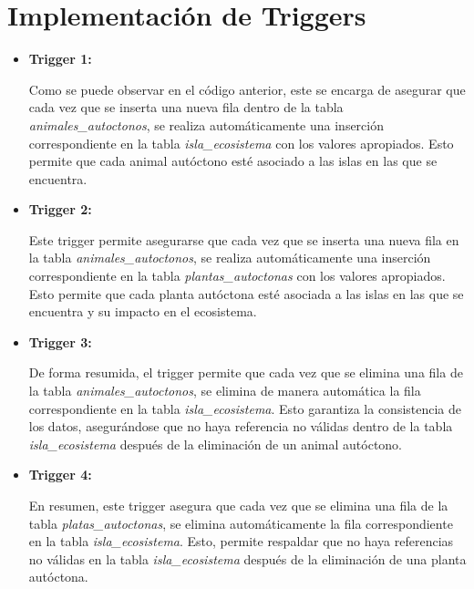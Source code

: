 \documentclass[11pt]{report}
\begin{document}
\section{Implementación de Triggers}
\begin{itemize}
      \item \textbf{Trigger 1:}
            \lstset{style=mystyle}
            

            Como se puede observar en el código anterior, este se encarga de asegurar que cada vez que se inserta una nueva fila dentro de la tabla \emph{animales\_autoctonos}, se realiza automáticamente una inserción correspondiente en la tabla \emph{isla\_ecosistema} con los valores apropiados. Esto permite que cada animal autóctono esté asociado a las islas en las que se encuentra.

      \item \textbf{Trigger 2:}
            \lstset{style=mystyle}
            

            Este trigger permite asegurarse que cada vez que se inserta una nueva fila en la tabla \emph{animales\_autoctonos}, se realiza automáticamente una inserción correspondiente en la tabla \emph{plantas\_autoctonas} con los valores apropiados. Esto permite que cada planta autóctona esté asociada a las islas en las que se encuentra y su impacto en el ecosistema.

      \item \textbf{Trigger 3:}
            \lstset{style=mystyle}
            

            De forma resumida, el trigger permite que cada vez que se elimina una fila de la tabla \emph{animales\_autoctonos}, se elimina de manera automática la fila correspondiente en la tabla \emph{isla\_ecosistema}. Esto garantiza la consistencia de los datos, asegurándose que no haya referencia no válidas dentro de la tabla \emph{isla\_ecosistema} después de la eliminación de un animal autóctono.

      \item \textbf{Trigger 4:}
            \lstset{style=mystyle}
            

            En resumen, este trigger asegura que cada vez que se elimina una fila de la tabla \emph{platas\_autoctonas}, se elimina automáticamente la fila correspondiente en la tabla \emph{isla\_ecosistema}. Esto, permite respaldar que no haya referencias no válidas en la tabla \emph{isla\_ecosistema} después de la eliminación de una planta autóctona.


\end{itemize}
\end{document}

